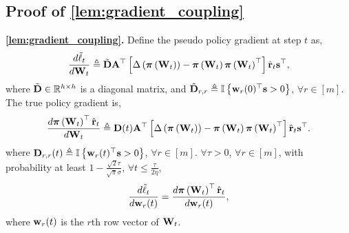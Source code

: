 \subsection{Proof of \cref{lem:gradient_coupling}}

{\bf \cref{lem:gradient_coupling}.} Define the pseudo policy gradient at step $t$ as,
\begin{equation*}
\begin{split}
	\frac{d \tilde{\ell}_t}{d {\mathbf{W}}_t} \triangleq \tilde{{\mathbf{D}}} {\mathbf{A}}^\top \left[ \Delta\left( {\boldsymbol{\pi}}\left({\mathbf{W}}_t\right) \right) - {\boldsymbol{\pi}}\left({\mathbf{W}}_t\right) {\boldsymbol{\pi}}\left({\mathbf{W}}_t\right)^\top \right] \hat{{\mathbf{r}}}_t {\mathbf{s}}^\top,
\end{split}
\end{equation*}
where $\tilde{{\mathbf{D}}} \in {\mathbb{R}}^{h \times h}$ is a diagonal matrix, and $\tilde{{\mathbf{D}}}_{r,r} \triangleq {\mathbb{I}}\left\{ {\mathbf{w}}_r(0)^\top {\mathbf{s}} > 0 \right\}$, $\forall r \in [m]$. The true policy gradient is,
\begin{equation*}
\begin{split}
    \frac{d {\boldsymbol{\pi}}\left({\mathbf{W}}_t\right)^\top \hat{{\mathbf{r}}}_t}{d {\mathbf{W}}_t} \triangleq  {\mathbf{D}}(t) {\mathbf{A}}^\top \left[ \Delta\left( {\boldsymbol{\pi}}\left({\mathbf{W}}_t\right) \right) - {\boldsymbol{\pi}}\left({\mathbf{W}}_t\right) {\boldsymbol{\pi}}\left({\mathbf{W}}_t\right)^\top \right] \hat{{\mathbf{r}}}_t {\mathbf{s}}^\top.
\end{split}
\end{equation*}
where ${\mathbf{D}}_{r,r}(t) \triangleq {\mathbb{I}}\left\{ {\mathbf{w}}_r(t)^\top {\mathbf{s}} > 0 \right\}$, $\forall r \in [m]$. $\forall \tau > 0$, $\forall r \in [m]$, with probability at least $1 - \frac{\sqrt{2}\tau}{\sqrt{\pi}\sigma}$, $\forall t \le \frac{\tau}{ 2 \eta }$,
\begin{equation*}
	\frac{d\tilde{\ell}_t}{d {\mathbf{w}}_r(t)} = \frac{d {\boldsymbol{\pi}}\left({\mathbf{W}}_t\right)^\top \hat{{\mathbf{r}}}_t}{d {\mathbf{w}}_r(t)},
\end{equation*}
where ${\mathbf{w}}_r(t)$ is the $r$th row vector of ${\mathbf{W}}_t$.
